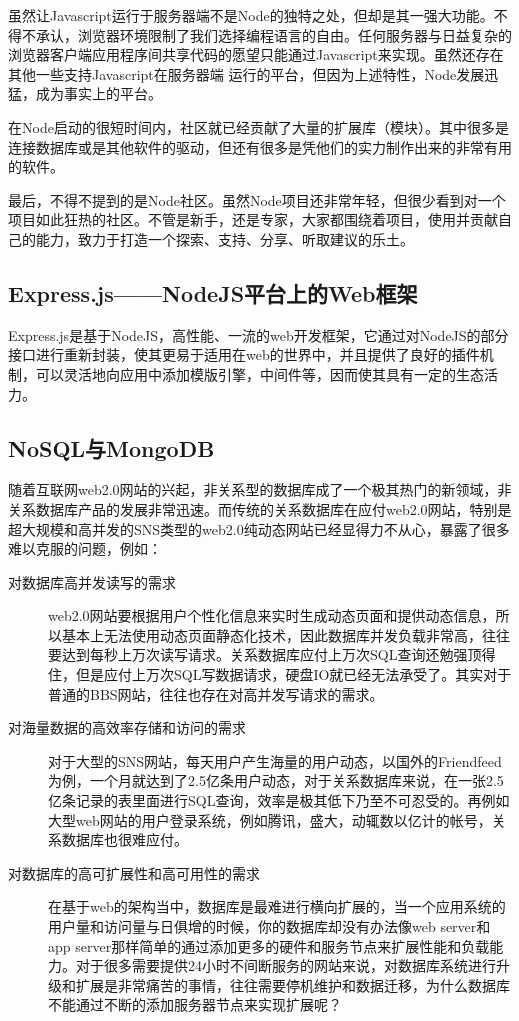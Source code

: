 虽然让Javascript运行于服务器端不是Node的独特之处，但却是其一强大功能。不得不承认，浏览器环境限制了我们选择编程语言的自由。任何服务器与日益复杂的浏览器客户端应用程序间共享代码的愿望只能通过Javascript来实现。虽然还存在其他一些支持Javascript在服务器端 运行的平台，但因为上述特性，Node发展迅猛，成为事实上的平台。

在Node启动的很短时间内，社区就已经贡献了大量的扩展库（模块）。其中很多是连接数据库或是其他软件的驱动，但还有很多是凭他们的实力制作出来的非常有用的软件。

最后，不得不提到的是Node社区。虽然Node项目还非常年轻，但很少看到对一个项目如此狂热的社区。不管是新手，还是专家，大家都围绕着项目，使用并贡献自己的能力，致力于打造一个探索、支持、分享、听取建议的乐土。

\subsection{Express.js——NodeJS平台上的Web框架}
\indent
Express.js是基于NodeJS，高性能、一流的web开发框架，它通过对NodeJS的部分接口进行重新封装，使其更易于适用在web的世界中，并且提供了良好的插件机制，可以灵活地向应用中添加模版引擎，中间件等，因而使其具有一定的生态活力。

\subsection{NoSQL与MongoDB}
\indent
随着互联网web2.0网站的兴起，非关系型的数据库成了一个极其热门的新领域，非关系数据库产品的发展非常迅速。而传统的关系数据库在应付web2.0网站，特别是超大规模和高并发的SNS类型的web2.0纯动态网站已经显得力不从心，暴露了很多难以克服的问题，例如：

\begin{description}
    \item[对数据库高并发读写的需求] web2.0网站要根据用户个性化信息来实时生成动态页面和提供动态信息，所以基本上无法使用动态页面静态化技术，因此数据库并发负载非常高，往往要达到每秒上万次读写请求。关系数据库应付上万次SQL查询还勉强顶得住，但是应付上万次SQL写数据请求，硬盘IO就已经无法承受了。其实对于普通的BBS网站，往往也存在对高并发写请求的需求。
    \item[对海量数据的高效率存储和访问的需求] 对于大型的SNS网站，每天用户产生海量的用户动态，以国外的Friendfeed为例，一个月就达到了2.5亿条用户动态，对于关系数据库来说，在一张2.5亿条记录的表里面进行SQL查询，效率是极其低下乃至不可忍受的。再例如大型web网站的用户登录系统，例如腾讯，盛大，动辄数以亿计的帐号，关系数据库也很难应付。
    \item[对数据库的高可扩展性和高可用性的需求] 在基于web的架构当中，数据库是最难进行横向扩展的，当一个应用系统的用户量和访问量与日俱增的时候，你的数据库却没有办法像web server和app server那样简单的通过添加更多的硬件和服务节点来扩展性能和负载能力。对于很多需要提供24小时不间断服务的网站来说，对数据库系统进行升级和扩展是非常痛苦的事情，往往需要停机维护和数据迁移，为什么数据库不能通过不断的添加服务器节点来实现扩展呢？
\end{description}

